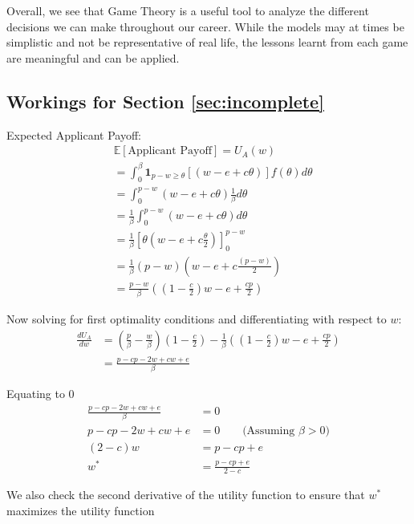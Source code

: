 \documentclass[a4paper, 12pt]{article}
\begin{document}
Overall, we see that Game Theory is a useful tool to analyze the different decisions we can make throughout our career. While the models may at times be simplistic and not be representative of real life, the lessons learnt from each game are meaningful and can be applied.

\appendix
\begin{appendices}

\section{Workings for Section \ref{sec:incomplete}}\label{app:incomplete-working}


Expected Applicant Payoff:
\begin{align*}
    &\mathbb{E}[\text{Applicant Payoff}] = U_A(w)  \\
    &= \int_0^{\beta} \mathbf{1}_{p-w\geq \theta}\left[(w - e + c\theta)\right] f(\theta) d\theta \\
    &= \int_0^{p-w} (w - e + c\theta) \frac{1}{\beta} d\theta \\
    &= \frac{1}{\beta}\int_0^{p-w} (w - e + c\theta) d\theta \\
    &= \frac{1}{\beta} \left[\theta \left(w - e + c\frac{\theta}{2}\right)\right]_{0}^{p-w}\\
    &= \frac{1}{\beta} (p-w)\left(w - e + c\frac{(p-w)}{2}\right)\\
    &= \frac{p-w}{\beta} \left(\left(1 - \frac{c}{2}\right)w - e + \frac{cp}{2}\right)
\end{align*}

Now solving for first optimality conditions and differentiating with respect to $w$:
\begin{align*}
    \frac{dU_A}{dw} &= \left(\frac{p}{\beta} - \frac{w}{\beta}\right)\left(1 - \frac{c}{2}\right) - \frac{1}{\beta}\left(\left(1 - \frac{c}{2}\right)w - e + \frac{cp}{2}\right) \\
    &= \frac{p-cp -2w+cw+e}{\beta}
\end{align*}

Equating to $0$
\begin{align*}
    \frac{p-cp -2w+cw+e}{\beta} &= 0 \\
    p - cp - 2w + cw + e &= 0 \qquad \text{(Assuming $\beta > 0$)} \\
    (2-c)w &= p - cp + e \\
    w^* &= \frac{p-cp+e}{2-c}
\end{align*}

We also check the second derivative of the utility function to ensure that $w^*$ maximizes the utility function


\end{appendices}
\end{document}
